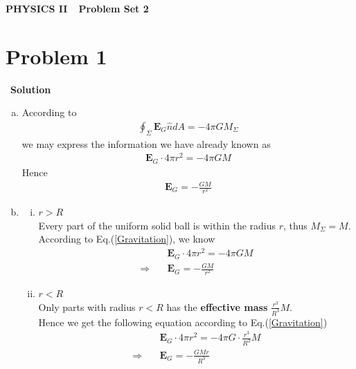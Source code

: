 \documentclass[12pt,a4paper]{article}
\begin{document}
\centerline{\Huge{{\textbf{PHYSICS II\ \ Problem Set 2}}}}
\vspace{0.5cm}
\section*{\large \textbf{Problem 1}}~{\textbf{Solution}}

\begin{enumerate}[(a)]
    \item According to
    \begin{align}
        \oint_{\Sigma} \mathbf{E}_{G} \hat{n} d A=-4 \pi G M_{\Sigma}
        \label{Gravitation}
    \end{align}
    we may express the information we have already known as 
    \begin{align}
        \mathbf{E}_{G} \cdot 4\pi r^2 = -4\pi GM
    \end{align}
    Hence
    \begin{align}
        \mathbf{E}_{G} = -\frac{GM}{r^2}
    \end{align}
    
    \item 
    \begin{enumerate}[i)]
        \item $r > R$ \\
        Every part of the uniform solid ball is within the radius $r$, thus $M_{\Sigma} = M$. \\
        According to Eq.(\ref{Gravitation}), we know
        \begin{align}
            &\mathbf{E}_{G} \cdot 4\pi r^2 = -4\pi GM \\
            \Rightarrow\quad &\mathbf{E}_{G} = -\frac{GM}{r^2}
        \end{align}
        
        \item $r < R$ \\
        Only parts with radius $r < R$ has the \textbf{effective mass} $\frac{r^3}{R^3} M$. \\
        Hence we get the following equation according to Eq.(\ref{Gravitation})
        \begin{align}
            &\mathbf{E}_{G} \cdot 4\pi r^2 = -4\pi G \cdot \frac{r^3}{R^3}M \\
            \Rightarrow\quad &\mathbf{E}_{G} = -\frac{GMr}{R^3}
        \end{align}
    \end{enumerate}
    

\end{enumerate}
\end{document}
